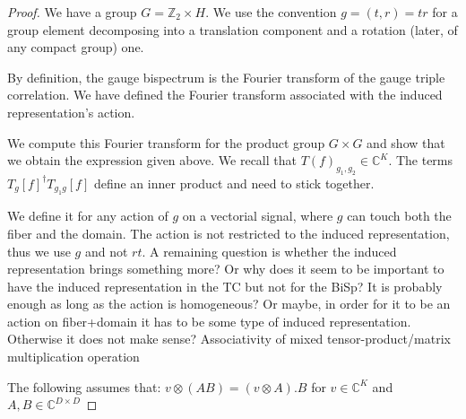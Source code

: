 \documentclass{article}
\begin{document}
\begin{proof}
We have a group $G = \mathbb{Z}_2 \times H$. We use the convention $g = (t, r) = tr$ for a group element decomposing into a translation component and a rotation (later, of any compact group) one.

By definition, the gauge bispectrum is the Fourier transform of the gauge triple correlation. We have defined the Fourier transform associated with the induced representation's action.

We compute this Fourier transform for the product group $G \times G$ and show that we obtain the expression given above. We recall that $T(f)_{g_1, g_2} \in \mathbb{C}^{K}$. The terms $T_{g}[f]^\dagger T_{g_1g}[f]$ define an inner product and need to stick together.


We define it for any action of $g$ on a vectorial signal, where $g$ can touch both the fiber and the domain. The action is not restricted to the induced representation, thus we use $g$ and not $rt$. A remaining question is whether the induced representation brings something more? Or why does it seem to be important to have the induced representation in the TC but not for the BiSp? It is probably enough as long as the action is homogeneous? Or maybe, in order for it to be an action on fiber+domain it has to be some type of induced representation. Otherwise it does not make sense?
Associativity of mixed tensor-product/matrix multiplication operation

The following assumes that: $v \otimes (AB) = (v\otimes A). B$ for $v\in\mathbb{C}^K$ and $A, B \in \mathbb{C}^{D \times D}$


\end{proof}
\end{document}
